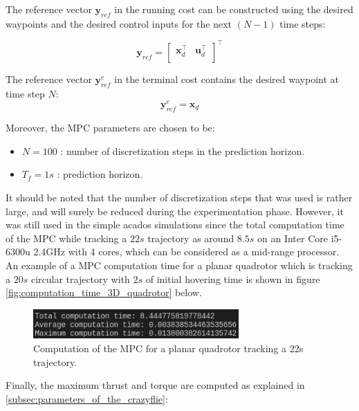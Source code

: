 \documentclass{thesisreport}
\begin{document}
 The reference vector $\bm{y}_{ref}$ in the running cost can be constructed using the desired waypoints and the desired control inputs for the next $(N-1)$ time steps:

\begin{equation}
	\bm{y}_{ref} = \begin{bmatrix}
		\bm{x}_d^{\intercal} & \bm{u}_d^{\intercal} \\
	\end{bmatrix}^{\intercal}
\end{equation}

The reference vector $\bm{y}_{ref}^e$ in the terminal cost contains the desired waypoint at time step $N$:
\begin{equation}
	\bm{y}_{ref}^e = \bm{x}_d
\end{equation}

\newpage

Moreover, the MPC parameters are chosen to be:
\begin{itemize}
	\item $N = 100$ : number of discretization steps in the prediction horizon.
	\item $T_f = 1s$ : prediction horizon.
\end{itemize}

It should be noted that the number of discretization steps that was used is rather large, and will surely be reduced during the experimentation phase. However, it was still used in the simple acados simulations since the total computation time of the MPC while tracking a $22s$ trajectory as around $8.5s$ on an Inter Core i5-6300u 2.4GHz with 4 cores, which can be considered as a mid-range processor. An example of a MPC computation time for a planar quadrotor which is tracking a $20s$ circular trajectory with $2s$ of initial hovering time is shown in figure \ref{fig:computation_time_3D_quadrotor} below.

\begin{figure}[h]
	\centering
	\includegraphics[width=0.7\textwidth]{Images/acados_simulations/circular_trajectory/planar_quadrotor/computation_time.png}
	\caption{Computation of the MPC for a planar quadrotor tracking a 22s trajectory.}
	\label{fig:computation_time_planar_quadrotor}
\end{figure}

Finally, the maximum thrust and torque are computed as explained in \ref{subsec:parameters_of_the_crazyflie}: 
\end{document}

